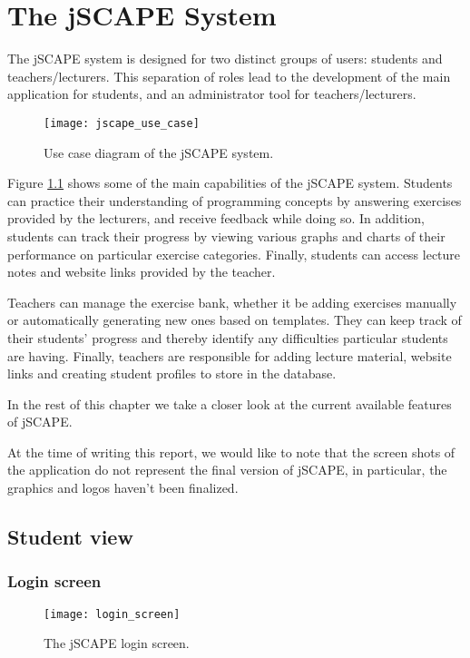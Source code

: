 \chapter{The jSCAPE System}
\label{chap:jscape-system}
The jSCAPE system is designed for two distinct groups of users: students and teachers/lecturers. This separation of roles lead to the development of the main application for students, and an administrator tool for teachers/lecturers.

\begin{figure}[H]
\centering
\texttt{[image: jscape\_use\_case]}
\caption{Use case diagram of the jSCAPE system.}
\label{fig:jscape_use_case}
\end{figure}

Figure \ref{fig:jscape_use_case} shows some of the main capabilities of the jSCAPE system. Students can practice their understanding of programming concepts by answering exercises provided by the lecturers, and receive feedback while doing so. In addition, students can track their progress by viewing various graphs and charts of their performance on particular exercise categories. Finally, students can access lecture notes and website links provided by the teacher. \newline

Teachers can manage the exercise bank, whether it be adding exercises manually or automatically generating new ones based on templates. They can keep track of their students' progress and thereby identify any difficulties particular students are having. Finally, teachers are responsible for adding lecture material, website links and creating student profiles to store in the database.\newline

In the rest of this chapter we take a closer look at the current available features of jSCAPE.\newline

At the time of writing this report, we would like to note that the screen shots of the application do not represent the final version of jSCAPE, in particular, the graphics and logos haven't been finalized.

\section{Student view}

\subsection{Login screen}
\begin{figure}[H]
\centering
\texttt{[image: login\_screen]}
\caption{The jSCAPE login screen.}
\label{fig:login_screen}
\end{figure}

